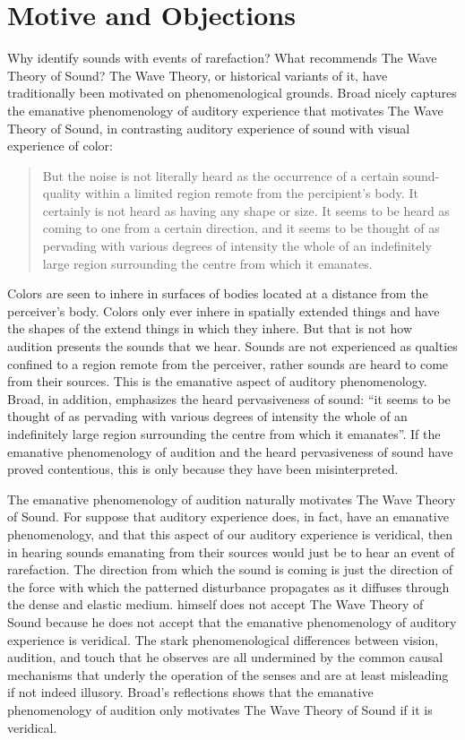 \documentclass[12pt]{article}
\begin{document}

\section{Motive and Objections} %
\label{sec:motive_and_objections}


Why identify sounds with events of rarefaction? What recommends The Wave Theory of Sound? The Wave Theory, or historical variants of it, have traditionally been motivated on phenomenological grounds. Broad nicely captures the emanative phenomenology of auditory experience that motivates The Wave Theory of Sound, in contrasting auditory experience of sound with visual experience of color:
\begin{quote}
	But the noise is not literally heard as the occurrence of a certain sound-quality within a limited region remote from the percipient's body. It certainly is not heard as having any shape or size. It seems to be heard as coming to one from a certain direction, and it seems to be thought of as pervading with various degrees of intensity the whole of an indefinitely large region surrounding the centre from which it emanates. \citep[5]{Broad:1952kx}
\end{quote}
Colors are seen to inhere in surfaces of bodies located at a distance from the perceiver's body. Colors only ever inhere in spatially extended things and have the shapes of the extend things in which they inhere. But that is not how audition presents the sounds that we hear. Sounds are not experienced as qualties confined to a region remote from the perceiver, rather sounds are heard to come from their sources. This is the emanative aspect of auditory phenomenology. Broad, in addition, emphasizes the heard pervasiveness of sound: ``it seems to be thought of as pervading with various degrees of intensity the whole of an indefinitely large region surrounding the centre from which it emanates''. If the emanative phenomenology of audition and the heard pervasiveness of sound have proved contentious, this is only because they have been misinterpreted.

The emanative phenomenology of audition naturally motivates The Wave Theory of Sound. For suppose that auditory experience does, in fact, have an emanative phenomenology, and that this aspect of our auditory experience is veridical, then in hearing sounds emanating from their sources would just be to hear an event of rarefaction. The direction from which the sound is coming is just the direction of the force with which the patterned disturbance propagates as it diffuses through the dense and elastic medium. \citet{Broad:1952kx} himself does not accept The Wave Theory of Sound because he does not accept that the emanative phenomenology of auditory experience is veridical. The stark phenomenological differences between vision, audition, and touch that he observes are all undermined by the common causal mechanisms that underly the operation of the senses and are at least misleading if not indeed illusory. Broad's reflections shows that the emanative phenomenology of audition only motivates The Wave Theory of Sound if it is veridical.
\end{document}
